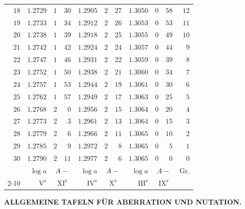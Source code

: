 \begin{center}
\begin{tabular}{r||r|rr||r|rr||r|rr||r}
$18$&$1.2729$&$1$&$30$&$1.2905$&$2$&$27$&$1.3050$&$0$&$58$&$12$\\
$19$&$1.2733$&$1$&$34$&$1.2912$&$2$&$26$&$1.3053$&$0$&$53$&$11$\\
$20$&$1.2738$&$1$&$39$&$1.2918$&$2$&$25$&$1.3055$&$0$&$49$&$10$\\[3pt]
$21$&$1.2742$&$1$&$42$&$1.2924$&$2$&$24$&$1.3057$&$0$&$44$&$9$\\
$22$&$1.2747$&$1$&$46$&$1.2931$&$2$&$22$&$1.3059$&$0$&$39$&$8$\\
$23$&$1.2752$&$1$&$50$&$1.2938$&$2$&$21$&$1.3060$&$0$&$34$&$7$\\
$24$&$1.2757$&$1$&$53$&$1.2944$&$2$&$19$&$1.3061$&$0$&$30$&$6$\\
$25$&$1.2762$&$1$&$57$&$1.2949$&$2$&$17$&$1.3063$&$0$&$25$&$5$\\[3pt]
$26$&$1.2768$&$2$&$0$&$1.2956$&$2$&$15$&$1.3064$&$0$&$20$&$4$\\
$27$&$1.2773$&$2$&$3$&$1.2961$&$2$&$13$&$1.3064$&$0$&$15$&$3$\\
$28$&$1.2779$&$2$&$6$&$1.2966$&$2$&$11$&$1.3065$&$0$&$10$&$2$\\
$29$&$1.2785$&$2$&$9$&$1.2972$&$2$&$8$&$1.3065$&$0$&$5$&$1$\\
$30$&$1.2790$&$2$&$11$&$1.2977$&$2$&$6$&$1.3065$&$0$&$0$&$0$\\
\hline
&$\log a$&\multicolumn{2}{c||}{$A-$}&$\log a$&\multicolumn{2}{c||}{$A-$}&$\log a$&\multicolumn{2}{c||}{$A-$}&Gr.\\\cline{2-10}
&$\mathrm V^{\mathrm z}$&\multicolumn{2}{c||}{$\mathrm{XI}^{\mathrm z}$}&$\mathrm{IV}^{\mathrm z}$&\multicolumn{2}{c||}{$\mathrm X^{\mathrm z}$}&$\mathrm{III}^{\mathrm z}$&\multicolumn{2}{c||}{$\mathrm{IX}^{\mathrm z}$}&
\end{tabular}
\endgroup
\end{center}
\clearpage
\thispagestyle{empty}
\noindent{}%
\makebox[12mm][l]{}%
\parbox[t]{\dimexpr\linewidth-24mm\relax}{\centering\fontsize{8.25}{10}\selectfont\bfseries ALLGEMEINE TAFELN FÜR ABERRATION UND NUTATION.\par}%
\par\nobreak\medskip
